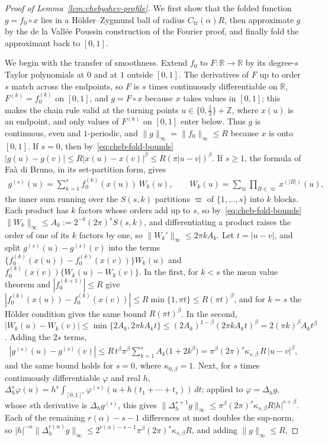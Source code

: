 \begin{proof}[Proof of Lemma~\ref{lem:chebyshev-profile}]
We first show that the folded function $g=f_0\circ x$ lies in a H\"older--Zygmund ball of radius $C_{\mathrm{tr}}(\alpha)R$, then approximate $g$ by the de la Vall\'ee Poussin construction of the Fourier proof, and finally fold the approximant back to $[0,1]$.

We begin with the transfer of smoothness. Extend $f_0$ to $F:\mathbb R\to\mathbb R$ by its degree-$s$ Taylor polynomials at $0$ and at $1$ outside $[0,1]$. The derivatives of $F$ up to order $s$ match across the endpoints, so $F$ is $s$ times continuously differentiable on $\mathbb R$, $F^{(k)}=f_0^{(k)}$ on $[0,1]$, and $g=F\circ x$ because $x$ takes values in $[0,1]$; this makes the chain rule valid at the turning points $u\in\{0,\tfrac12\}+\mathbb Z$, where $x(u)$ is an endpoint, and only values of $F^{(k)}$ on $[0,1]$ enter below. Thus $g$ is continuous, even and $1$-periodic, and $\|g\|_\infty=\|f_0\|_\infty\leq R$ because $x$ is onto $[0,1]$. If $s=0$, then by~\eqref{eq:cheb-fold-bounds} $|g(u)-g(v)|\leq R|x(u)-x(v)|^\beta\leq R(\pi|u-v|)^\beta$. If $s\geq1$, the formula of Fa\`a di Bruno, in its set-partition form, gives
\begin{align*}
g^{(s)}(u)=\sum_{k=1}^sf_0^{(k)}(x(u))\,W_k(u),
\qquad
W_k(u)=\sum_{\varpi}\prod_{B\in\varpi}x^{(|B|)}(u),
\end{align*}
the inner sum running over the $S(s,k)$ partitions $\varpi$ of $\{1,\ldots,s\}$ into $k$ blocks. Each product has $k$ factors whose orders add up to $s$, so by~\eqref{eq:cheb-fold-bounds} $\|W_k\|_\infty\leq A_k:=2^{-k}(2\pi)^sS(s,k)$, and differentiating a product raises the order of one of its $k$ factors by one, so $\|W_k'\|_\infty\leq2\pi kA_k$. Let $t=|u-v|$, and split $g^{(s)}(u)-g^{(s)}(v)$ into the terms $\{f_0^{(k)}(x(u))-f_0^{(k)}(x(v))\}W_k(u)$ and $f_0^{(k)}(x(v))\{W_k(u)-W_k(v)\}$. In the first, for $k<s$ the mean value theorem and $|f_0^{(k+1)}|\leq R$ give $|f_0^{(k)}(x(u))-f_0^{(k)}(x(v))|\leq R\min\{1,\pi t\}\leq R(\pi t)^\beta$, and for $k=s$ the H\"older condition gives the same bound $R(\pi t)^\beta$. In the second, $|W_k(u)-W_k(v)|\leq\min\{2A_k,2\pi kA_kt\}\leq(2A_k)^{1-\beta}(2\pi kA_kt)^\beta=2(\pi k)^\beta A_kt^\beta$. Adding the $2s$ terms,
\begin{align*}
|g^{(s)}(u)-g^{(s)}(v)|
\leq R\,t^\beta\pi^\beta\sum_{k=1}^sA_k\bigl(1+2k^\beta\bigr)
=\pi^\beta(2\pi)^s\kappa_{s,\beta}\,R\,|u-v|^\beta,
\end{align*}
and the same bound holds for $s=0$, where $\kappa_{0,\beta}=1$. Next, for $s$ times continuously differentiable $\varphi$ and real $h$, $\Delta_h^s\varphi(u)=h^s\int_{[0,1]^s}\varphi^{(s)}(u+h(t_1+\cdots+t_s))\,dt$; applied to $\varphi=\Delta_hg$, whose $s$th derivative is $\Delta_hg^{(s)}$, this gives $\|\Delta_h^{s+1}g\|_\infty\leq\pi^\beta(2\pi)^s\kappa_{s,\beta}R|h|^{s+\beta}$. Each of the remaining $r(\alpha)-s-1$ differences at most doubles the sup-norm, so $|h|^{-\alpha}\|\Delta_h^{r(\alpha)}g\|_\infty\leq2^{r(\alpha)-s-1}\pi^\beta(2\pi)^s\kappa_{s,\beta}R$, and adding $\|g\|_\infty\leq R$,

\end{proof}
